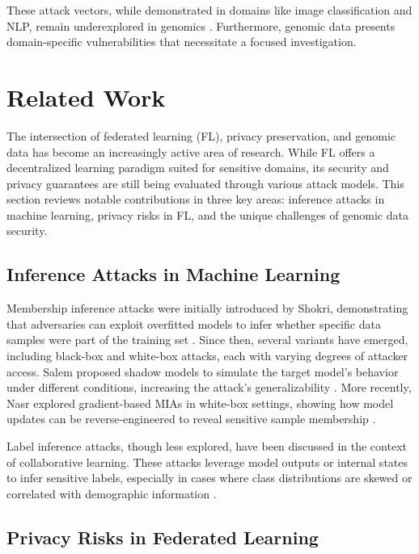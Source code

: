 \documentclass[conference]{IEEEtran}
\begin{document}
These attack vectors, while demonstrated in domains like image classification and NLP, remain underexplored in genomics \cite{efficacy2024offederated10}\cite{Nasr_2019compre16}. Furthermore, genomic data presents domain-specific vulnerabilities that necessitate a focused investigation.

\section{Related Work}

The intersection of federated learning (FL), privacy preservation, and genomic data has become an increasingly active area of research. While FL offers a decentralized learning paradigm suited for sensitive domains, its security and privacy guarantees are still being evaluated through various attack models. This section reviews notable contributions in three key areas: inference attacks in machine learning, privacy risks in FL, and the unique challenges of genomic data security.

\subsection{Inference Attacks in Machine Learning}

Membership inference attacks were initially introduced by Shokri, demonstrating that adversaries can exploit overfitted models to infer whether specific data samples were part of the training set \cite{shokri2017membership17}. Since then, several variants have emerged, including black-box and white-box attacks, each with varying degrees of attacker access. Salem proposed shadow models to simulate the target model’s behavior under different conditions, increasing the attack’s generalizability \cite{salem2018mlleak26}. More recently, Nasr explored gradient-based MIAs in white-box settings, showing how model updates can be reverse-engineered to reveal sensitive sample membership \cite{Nasr_2019compre16}.

Label inference attacks, though less explored, have been discussed in the context of collaborative learning. These attacks leverage model outputs or internal states to infer sensitive labels, especially in cases where class distributions are skewed or correlated with demographic information \cite{hasan2023security19}\cite{jaydip2024privacy28}.

\subsection{ Privacy Risks in Federated Learning}
\end{document}
